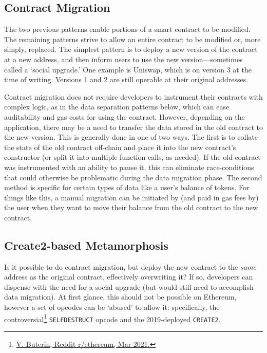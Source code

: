 
\subsection{Contract Migration}
\label{sec:migration}

The two previous patterns enable portions of a smart contract to be modified. The remaining patterns strive to allow an entire contract to be modified or, more simply, replaced. The simplest pattern is to deploy a new version of the contract at a new address, and then inform users to use the new version---sometimes called a `social upgrade.' One example is Uniswap, which is on version 3 at the time of writing. Versions 1 and 2 are still operable at their original addresses. 

Contract migration does not require developers to instrument their contracts with complex logic, as in the data separation patterns below, which can ease auditability and gas costs for using the contract. However, depending on the application, there may be a need to transfer the data stored in the old contract to the new version. This is generally done in one of two ways. The first is to collate the state of the old contract off-chain and place it into the new contract's constructor (or split it into multiple function calls, as needed). If the old contract was instrumented with an ability to pause it, this can eliminate race-conditions that could otherwise be problematic during the data migration phase. The second method is specific for certain types of data like a user's balance of tokens. For things like this, a manual migration can be initiated by (and paid in gas fees by) the user when they want to move their balance from the old contract to the new contract.  
 


\subsection{Create2-based Metamorphosis}
\label{sec:metamorphic}

Is it possible to do contract migration, but deploy the new contract to the \textit{same} address as the original contract, effectively overwriting it? If so, developers can dispense with the need for a social upgrade (but would still need to accomplish data migration). At first glance, this should not be possible on Ethereum, however a set of opcodes can be `abused' to allow it: specifically, the controversial\footnote{\href{https://www.reddit.com/r/ethereum/comments/lx32kv/expectations\_for\_backwardsincompatible\_changes/}{V. Buterin, Reddit r/ethereum, Mar 2021.}} \texttt{SELFDESTRUCT} opcode and the 2019-deployed \texttt{CREATE2}. 


